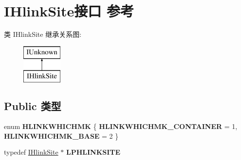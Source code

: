 \hypertarget{interface_i_hlink_site}{}\section{I\+Hlink\+Site接口 参考}
\label{interface_i_hlink_site}
类 I\+Hlink\+Site 继承关系图\+:\begin{figure}[H]
\begin{center}
\leavevmode
\includegraphics[height=2.000000cm]{interface_i_hlink_site}
\end{center}
\end{figure}
\subsection*{Public 类型}
\begin{DoxyCompactItemize}
\item 
\mbox{\label{interface_i_hlink_site_a9ea0b322b70f61679d943b019f0e9db2}} 
enum {\bfseries H\+L\+I\+N\+K\+W\+H\+I\+C\+H\+MK} \{ {\bfseries H\+L\+I\+N\+K\+W\+H\+I\+C\+H\+M\+K\+\_\+\+C\+O\+N\+T\+A\+I\+N\+ER} = 1, 
{\bfseries H\+L\+I\+N\+K\+W\+H\+I\+C\+H\+M\+K\+\_\+\+B\+A\+SE} = 2
 \}
\item 
\mbox{\label{interface_i_hlink_site_ae5e85913fefcc425bcceeac6eb104ff7}} 
typedef \hyperlink{interface_i_hlink_site}{I\+Hlink\+Site} $\ast$ {\bfseries L\+P\+H\+L\+I\+N\+K\+S\+I\+TE}
\end{DoxyCompactItemize}
